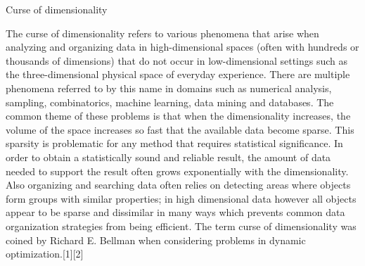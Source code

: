 Curse of dimensionality

The curse of dimensionality refers to various phenomena that arise when analyzing and organizing data in high-dimensional spaces (often with hundreds or thousands of dimensions) that do not occur in low-dimensional settings such as the three-dimensional physical space of everyday experience.
There are multiple phenomena referred to by this name in domains such as numerical analysis, sampling, combinatorics, machine learning, data mining and databases. The common theme of these problems is that when the dimensionality increases, the volume of the space increases so fast that the available data become sparse. This sparsity is problematic for any method that requires statistical significance. In order to obtain a statistically sound and reliable result, the amount of data needed to support the result often grows exponentially with the dimensionality. Also organizing and searching data often relies on detecting areas where objects form groups with similar properties; in high dimensional data however all objects appear to be sparse and dissimilar in many ways which prevents common data organization strategies from being efficient.
The term curse of dimensionality was coined by Richard E. Bellman when considering problems in dynamic optimization.[1][2]
